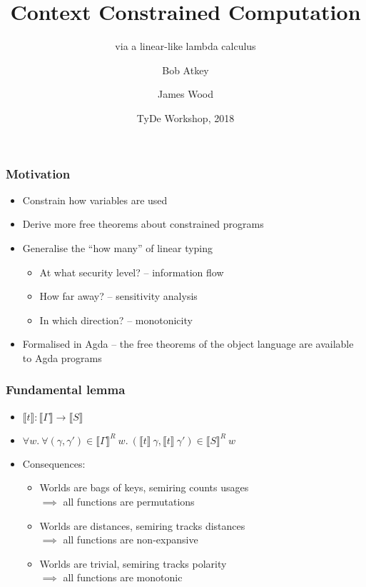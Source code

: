 \documentclass{beamer}
\title{Context Constrained Computation}
\subtitle{via a linear-like lambda calculus}
\author{Bob Atkey\inst{1} \and James Wood\inst{1}}
\institute{\inst{1}University of Strathclyde}
\date{TyDe Workshop, 2018}
\begin{document}
  \frame{\titlepage}
  \begin{frame}
    \frametitle{Motivation}

    \begin{itemize}
    \item Constrain how variables are used
    \item Derive more free theorems about constrained programs
    \item Generalise the ``how many'' of linear typing \pause
      \begin{itemize}
      \item At what security level? -- information flow \pause
      \item How far away? -- sensitivity analysis \pause
      \item In which direction? -- monotonicity \pause
      \end{itemize}
    \item Formalised in Agda -- the free theorems of the object language are
      available to Agda programs
    \end{itemize}
  \end{frame}
  \begin{frame}
    \frametitle{Fundamental lemma}
    \begin{itemize}
    \item $\llbracket t \rrbracket : \llbracket \Gamma \rrbracket \to
      \llbracket S \rrbracket$
    \item $\forall w.~\forall(\gamma, \gamma') \in \llbracket \Gamma
      \rrbracket^R~w.~(\llbracket t \rrbracket~\gamma, \llbracket t
      \rrbracket~\gamma') \in \llbracket S \rrbracket^R~w$
    \item Consequences:
      \begin{itemize}
      \item Worlds are bags of keys, semiring counts usages \\
        $\implies$ all functions are permutations
      \item Worlds are distances, semiring tracks distances \\
        $\implies$ all functions are non-expansive
      \item Worlds are trivial, semiring tracks polarity \\
        $\implies$ all functions are monotonic
      \end{itemize}
    \end{itemize}
  \end{frame}
\end{document}
